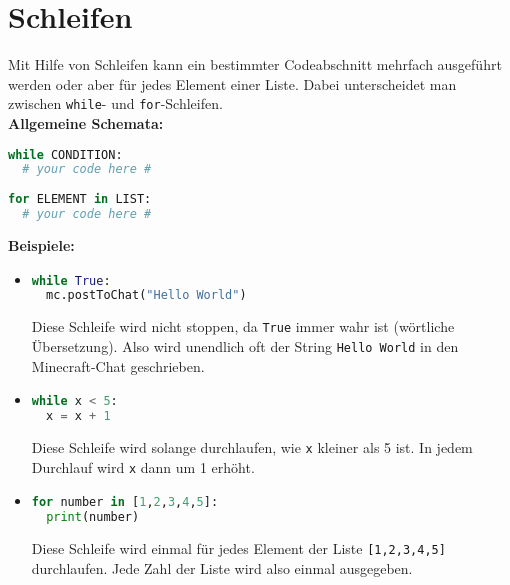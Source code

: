 \documentclass{article}
\begin{document}
	\section{Schleifen}
	Mit Hilfe von Schleifen kann ein bestimmter Codeabschnitt mehrfach ausgeführt werden oder aber für jedes Element einer Liste. Dabei unterscheidet man zwischen \texttt{while}- und \texttt{for}-Schleifen.\\
	\textbf{Allgemeine Schemata:}
	\begin{lstlisting}[language=Python]
while CONDITION:
  # your code here #
	
for ELEMENT in LIST:
  # your code here #
	\end{lstlisting}
	\textbf{Beispiele:}
	\begin{itemize}
		\item \begin{lstlisting}[language=Python]
while True:
  mc.postToChat("Hello World")
		\end{lstlisting}
		Diese Schleife wird nicht stoppen, da \texttt{True} immer wahr ist (wörtliche Übersetzung). Also wird unendlich oft der String \texttt{Hello World} in den Minecraft-Chat geschrieben.
		
		\item \begin{lstlisting}[language=Python]
while x < 5:
  x = x + 1
		\end{lstlisting}
		Diese Schleife wird solange durchlaufen, wie \texttt{x} kleiner als 5 ist. In jedem Durchlauf wird \texttt{x} dann um 1 erhöht.
		
		\item \begin{lstlisting}[language=Python]
for number in [1,2,3,4,5]:
  print(number)
		\end{lstlisting}
		Diese Schleife wird einmal für jedes Element der Liste \texttt{[1,2,3,4,5]} durchlaufen. Jede Zahl der Liste wird also einmal ausgegeben.
	\end{itemize}
\end{document}
